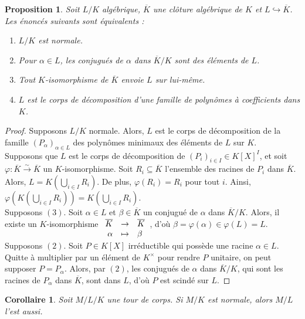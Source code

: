 \documentclass{article}
\newcommand{\applic}[4]{\begin{array}[t]{rcl}
#1 & \to & #2 \\
#3 & \mapsto & #4
\end{array}}
\theoremstyle{plain}
\newtheorem{proposition}[theorem]{Proposition}
\newtheorem{corollary}[theorem]{Corollaire}
\theoremstyle{definition}
\theoremstyle{remark}
\begin{document}
\begin{proposition} \label{caracextnormale}
    Soit $L/K$ algébrique, $\overline{K}$ une clôture algébrique de $K$ et $L \hookrightarrow \overline{K}$. Les énoncés suivants sont équivalents :
    \begin{enumerate}
        \item $L/K$ est normale.
        \item Pour $\alpha \in L$, les conjugués de $\alpha$ dans $\overline{K}/K$ sont des éléments de $L$.
        \item Tout $K$-isomorphisme de $\overline{K}$ envoie $L$ sur lui-même.
        \item $L$ est le corps de décomposition d'une famille de polynômes à coefficients dans $K$.
    \end{enumerate}
\end{proposition}

\begin{proof}
    Supposons $L/K$ normale. Alors, $L$ est le corps de décomposition de la famille $(P_\alpha)_{\alpha \in L}$ des polynômes minimaux des éléments de $L$ sur $K$. \\
    Supposons que $L$ est le corps de décomposition de $(P_i)_{i\in I} \in K[X]^I$, et soit $\varphi : \overline{K} \xrightarrow{\sim}\overline{K}$ un $K$-isomorphisme. Soit $R_i \subseteq \overline{K}$ l'ensemble des racines de $P_i$ dans $\overline{K}$. Alors, $L = K(\bigcup_{i\in I} R_i)$. De plus, $\varphi(R_i) = R_i$ pour tout $i$. Ainsi, $\varphi(K(\bigcup_{i\in I} R_i)) = K(\bigcup_{i\in I} R_i)$. \\
    Supposons $(3)$. Soit $\alpha \in L$ et $\beta \in \overline{K}$ un conjugué de $\alpha$ dans $\overline{K}/K$. Alors, il existe un $K$-isomorphisme $\applic{\overline{K}}{\overline{K}}{\alpha}{\beta}$, d'où $\beta = \varphi(\alpha) \in \varphi(L) = L$. \\
    Supposons $(2)$. Soit $P \in K[X]$ irréductible qui possède une racine $\alpha \in L$. Quitte à multiplier par un élément de $K^\times$ pour rendre $P$ unitaire, on peut supposer $P = P_\alpha$. Alors, par $(2)$, les conjugués de $\alpha$ dans $\overline{K}/K$, qui sont les racines de $P_\alpha$ dans $\overline{K}$, sont dans $L$, d'où $P$ est scindé sur $L$.
\end{proof}

\begin{corollary}
    Soit $M/L/K$ une tour de corps. Si $M/K$ est normale, alors $M/L$ l'est aussi.
\end{corollary}
\end{document}

